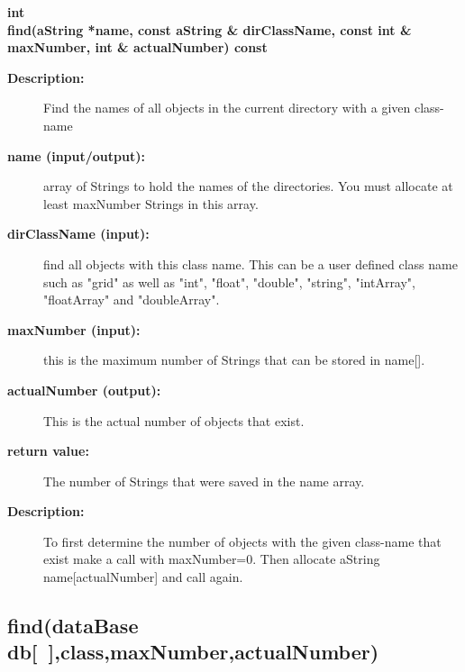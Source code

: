 \begin{flushleft} \textbf{%
int  \\ 
\settowidth{\GenericDataBaseIncludeArgIndent}{find(}%
find(aString *name, const aString \& dirClassName, const int \& maxNumber, int \& actualNumber) const
}\end{flushleft}
\begin{description}
\item[{\bf Description:}] 
   Find the names of all objects in the current directory with a given class-name

\item[{\bf name (input/output):}]  array of Strings to hold the names of the directories. You must allocate at
     least maxNumber Strings in this array.
\item[{\bf dirClassName (input):}]  find all objects with this class name. This can be a user defined class name
    such as "grid" as well as "int", "float", "double", "string", "intArray", "floatArray" and "doubleArray".
\item[{\bf maxNumber (input):}]  this is the maximum number of Strings that 
         can be stored in name[]. 
\item[{\bf actualNumber (output):}]  This is the actual number of objects that exist.
\item[{\bf return value:}]   The number of Strings that were saved in the name array.

\item[{\bf Description:}] 
   To first determine the number of objects with the given class-name that exist 
    make a call with maxNumber=0. Then allocate aString name[actualNumber] and call again.
    
\end{description}
\subsection{find(dataBase db[~],class,maxNumber,actualNumber) }
 
